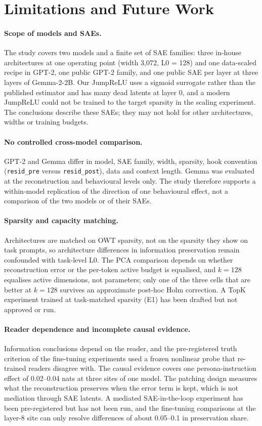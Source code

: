 \section{Limitations and Future Work}\label{sec:limits}

\paragraph{Scope of models and SAEs.} The study covers two models and a finite set of SAE families: three in-house
architectures at one operating point (width 3{,}072, L0 = 128) and one data-scaled recipe in GPT-2, one public GPT-2
family, and one public SAE per layer at three layers of Gemma-2-2B. Our JumpReLU uses a sigmoid surrogate rather than
the published estimator and has many dead latents at layer 0, and a modern JumpReLU could not be trained to the target
sparsity in the scaling experiment. The conclusions describe these SAEs; they may not hold for other architectures,
widths or training budgets.

\paragraph{No controlled cross-model comparison.} GPT-2 and Gemma differ in model, SAE family, width, sparsity, hook
convention (\texttt{resid\_pre} versus \texttt{resid\_post}), data and context length. Gemma was evaluated at the
reconstruction and behavioural levels only. The study therefore supports a within-model replication of the direction
of one behavioural effect, not a comparison of the two models or of their SAEs.

\paragraph{Sparsity and capacity matching.} Architectures are matched on OWT sparsity, not on the sparsity they show
on task prompts, so architecture differences in information preservation remain confounded with task-level L0. The PCA
comparison depends on whether reconstruction error or the per-token active budget is equalised, and $k=128$ equalises
active dimensions, not parameters; only one of the three cells that are better at $k=128$ survives an approximate
post-hoc Holm correction. A TopK experiment trained at task-matched sparsity (E1) has been drafted but not approved or
run.

\paragraph{Reader dependence and incomplete causal evidence.} Information conclusions depend on the reader, and the
pre-registered truth criterion of the fine-tuning experiments used a frozen nonlinear probe that re-trained readers
disagree with. The causal evidence covers one persona-instruction effect of 0.02--0.04 nats at three sites of one model.
The patching design measures what the reconstruction preserves when the error term is kept, which is not mediation
through SAE latents. A mediated SAE-in-the-loop experiment has been pre-registered but has not been run, and the
fine-tuning comparisons at the layer-8 site can only resolve differences of about 0.05--0.1 in preservation share.

